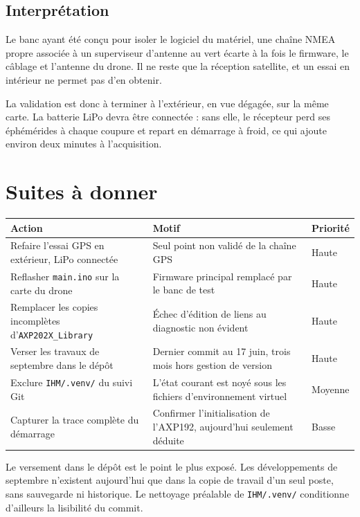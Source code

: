 \documentclass[11pt,a4paper]{article}
\newcommand{\code}[1]{\texttt{#1}}
\begin{document}
\subsection{Interprétation}

Le banc ayant été conçu pour isoler le logiciel du matériel, une chaîne NMEA
propre associée à un superviseur d'antenne au vert écarte à la fois le
firmware, le câblage et l'antenne du drone. Il ne reste que la réception
satellite, et un essai en intérieur ne permet pas d'en obtenir.

La validation est donc à terminer à l'extérieur, en vue dégagée, sur la même
carte. La batterie LiPo devra être connectée : sans elle, le récepteur perd ses
éphémérides à chaque coupure et repart en démarrage à froid, ce qui ajoute
environ deux minutes à l'acquisition.

\section{Suites à donner}

\vspace{0.3em}
{\footnotesize
\begin{tabularx}{\textwidth}{@{}X X l@{}}
\toprule
\textbf{Action} & \textbf{Motif} & \textbf{Priorité} \\
\midrule
Refaire l'essai GPS en extérieur, LiPo connectée & Seul point non validé de la chaîne GPS & Haute \\
Reflasher \code{main.ino} sur la carte du drone & Firmware principal remplacé par le banc de test & Haute \\
Remplacer les copies incomplètes d'\code{AXP202X\_Library} & Échec d'édition de liens au diagnostic non évident & Haute \\
Verser les travaux de septembre dans le dépôt & Dernier commit au 17 juin, trois mois hors gestion de version & Haute \\
Exclure \code{IHM/.venv/} du suivi Git & L'état courant est noyé sous les fichiers d'environnement virtuel & Moyenne \\
Capturer la trace complète du démarrage & Confirmer l'initialisation de l'AXP192, aujourd'hui seulement déduite & Basse \\
\bottomrule
\end{tabularx}
}
\vspace{0.3em}

Le versement dans le dépôt est le point le plus exposé. Les développements de
septembre n'existent aujourd'hui que dans la copie de travail d'un seul poste,
sans sauvegarde ni historique. Le nettoyage préalable de \code{IHM/.venv/}
conditionne d'ailleurs la lisibilité du commit.
\end{document}
